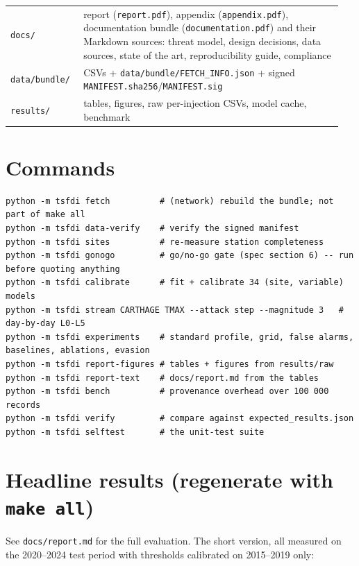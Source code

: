 \documentclass[10pt,a4paper]{article}
\begin{document}
{\begin{longtable}{>{\raggedright\arraybackslash}p{0.209\linewidth}>{\raggedright\arraybackslash}p{0.744\linewidth}}
\texttt{docs/\allowbreak{}} & report (\texttt{report.pdf}), appendix (\texttt{appendix.pdf}), documentation bundle (\texttt{documentation.pdf}) and their Markdown sources: threat model, design decisions, data sources, state of the art, reproducibility guide, compliance \\
\texttt{data/\allowbreak{}bundle/\allowbreak{}} & 24 CSVs + \texttt{data/\allowbreak{}bundle/\allowbreak{}FETCH\_\allowbreak{}INFO.json} + signed \texttt{MANIFEST.sha256}/\allowbreak{}\texttt{MANIFEST.sig} \\
\texttt{results/\allowbreak{}} & tables, figures, raw per-\allowbreak{}injection CSVs, model cache, benchmark \\
\end{longtable}
}

\section*{Commands}
\begin{Verbatim}[breaklines=true,breakanywhere=true,fontsize=\footnotesize,frame=none,numbers=none]
python -m tsfdi fetch          # (network) rebuild the bundle; not part of make all
python -m tsfdi data-verify    # verify the signed manifest
python -m tsfdi sites          # re-measure station completeness
python -m tsfdi gonogo         # go/no-go gate (spec section 6) -- run before quoting anything
python -m tsfdi calibrate      # fit + calibrate 34 (site, variable) models
python -m tsfdi stream CARTHAGE TMAX --attack step --magnitude 3   # day-by-day L0-L5
python -m tsfdi experiments    # standard profile, grid, false alarms, baselines, ablations, evasion
python -m tsfdi report-figures # tables + figures from results/raw
python -m tsfdi report-text    # docs/report.md from the tables
python -m tsfdi bench          # provenance overhead over 100 000 records
python -m tsfdi verify         # compare against expected_results.json
python -m tsfdi selftest       # the unit-test suite
\end{Verbatim}

\section*{Headline results (regenerate with \texttt{make all})}
See \texttt{docs/\allowbreak{}report.md} for the full evaluation. The short version, all measured on the 2020–2024 test period with thresholds calibrated on 2015–2019 only:
\end{document}
